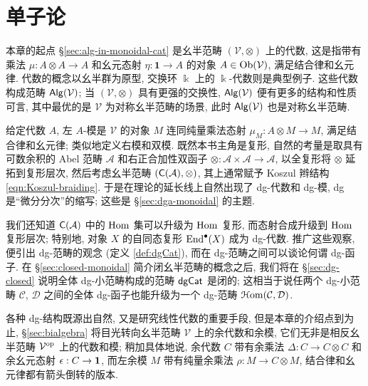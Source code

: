 
\chapter{单子论}\label{sec:monads}
本章的起点 \S\ref{sec:alg-in-monoidal-cat} 是幺半范畴 $(\mathcal{V}, \otimes)$ 上的代数, 这是指带有乘法 $\mu: A \otimes A \to A$ 和幺元态射 $\eta: \mathbf{1} \to A$ 的对象 $A \in \operatorname{Ob}(\mathcal{V})$, 满足结合律和幺元律. 代数的概念以幺半群为原型, 交换环 $\Bbbk$ 上的 $\Bbbk$-代数则是典型例子. 这些代数构成范畴 $\mathsf{Alg}(\mathcal{V})$; 当 $(\mathcal{V}, \otimes)$ 具有更强的交换性, $\mathsf{Alg}(\mathcal{V})$ 便有更多的结构和性质可言, 其中最优的是 $\mathcal{V}$ 为对称幺半范畴的场景, 此时 $\mathsf{Alg}(\mathcal{V})$ 也是对称幺半范畴.

给定代数 $A$, 左 $A$-模是 $\mathcal{V}$ 的对象 $M$ 连同纯量乘法态射 $\mu_M: A \otimes M \to M$, 满足结合律和幺元律; 类似地定义右模和双模. 既然本书主角是复形, 自然的考量是取具有可数余积的 Abel 范畴 $\mathcal{A}$ 和右正合加性双函子 $\otimes: \mathcal{A} \times \mathcal{A} \to \mathcal{A}$, 以全复形将 $\otimes$ 延拓到复形层次, 然后考虑幺半范畴 $(\mathsf{C}(\mathcal{A}), \otimes)$, 其上通常赋予 Koszul 辫结构 \eqref{eqn:Koszul-braiding}. 于是在理论的延长线上自然出现了 dg-代数和 dg-模, dg 是``微分分次''的缩写; 这些是 \S\ref{sec:dga-monoidal} 的主题.

我们还知道 $\mathsf{C}(\mathcal{A})$ 中的 $\operatorname{Hom}$ 集可以升级为 $\operatorname{Hom}$ 复形, 而态射合成升级到 $\operatorname{Hom}$ 复形层次; 特别地, 对象 $X$ 的自同态复形 $\operatorname{End}^\bullet(X)$ 成为 dg-代数. 推广这些观察, 便引出 dg-范畴的观念 (定义 \ref{def:dgCat}), 而在 dg-范畴之间可以谈论何谓 dg-函子. 在 \S\ref{sec:closed-monoidal} 简介闭幺半范畴的概念之后, 我们将在 \S\ref{sec:dg-closed} 说明全体 dg-小范畴构成的范畴 $\mathsf{dgCat}$ 是闭的; 这相当于说任两个 dg-小范畴 $\mathcal{C}$, $\mathcal{D}$ 之间的全体 dg-函子也能升级为一个 dg-范畴 $\EuScript{H}\mathrm{om}(\mathcal{C}, \mathcal{D})$.

各种 dg-结构既源出自然, 又是研究线性代数的重要手段, 但是本章的介绍点到为止, \S\ref{sec:bialgebra} 将目光转向幺半范畴 $\mathcal{V}$ 上的余代数和余模, 它们无非是相反幺半范畴 $\mathcal{V}^{\operatorname{op}}$ 上的代数和模; 稍加具体地说, 余代数 $C$ 带有余乘法 $\Delta: C \to C \otimes C$ 和余幺元态射 $\epsilon: C \to \bm{1}$, 而左余模 $M$ 带有纯量余乘法 $\rho: M \to C \otimes M$, 结合律和幺元律都有箭头倒转的版本.

